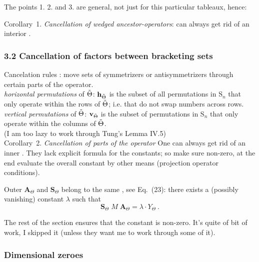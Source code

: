 The points 1. 2. and 3. are general, not just for this particular tableaux,
hence:

Corollary~1. {\em Cancellation of wedged ancestor-operators}:
can always get rid of an interior \Ypo.

\subsubsection{%
3.2 Cancellation of factors between bracketing sets}

Cancelation rules :
move sets of symmetrizers or antisymmetrizers
through certain parts of the operator.
\\

\noindent\emph{horizontal permutations} of $\Tilde{\Theta}$:
$\mathbf{h}_{\Tilde{\Theta}}$ is the subset of all permutations in
  $\textrm{S}_n$ that only operate within the rows of $\Tilde{\Theta}$; i.e. that do
  not swap numbers across rows. \\
\emph{vertical permutations} of $\Tilde{\Theta}$:
  $\mathbf{v}_{\Tilde{\Theta}}$ is the subset of permutations in $\textrm{S}_n$
  that only operate within the columns of $\Tilde{\Theta}$.
\\

(I am too lazy to work through Tung's Lemma IV.5)
\\


Corollary~2. {\em Cancellation of parts of the operator}
One can always get rid of an inner \Ypo. They lack explicit formula
for the constants; so make sure non-zero, at the end evaluate
the overall constant by other means (projection operator conditions).

Outer $\mathbf{A}_{\Theta}$ and $\mathbf{S}_{\Theta}$ belong to the same
\Ypo, see Eq.~(23): there exists a (possibly vanishing)
constant $\lambda$ such that
  \begin{equation}
    \label{eq:Cancel-General-O}
\mathbf{S}_{\Theta} \; M \; \mathbf{A}_{\Theta} =
\lambda \cdot Y_{\Theta}
\ .
  \end{equation}

The rest of the section  ensures that the constant is non-zero. It's quite of
bit of work, I skipped it (unless they want me to work through some of it).

\subsubsection{%
Dimensional zeroes}

